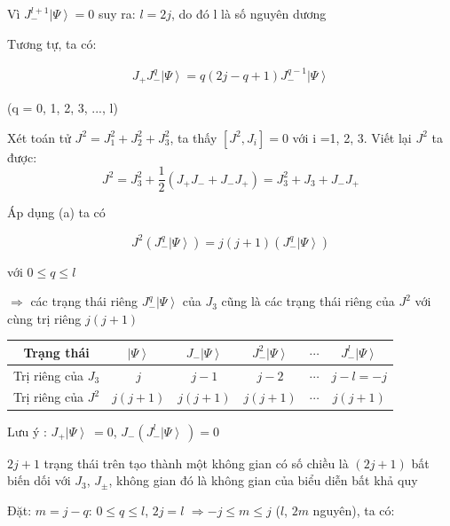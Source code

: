 \documentclass{report}
\begin{document}
Vì \( J_{-}^{l+1} \left| {\Psi} \right\rangle = 0 \) suy ra: \underline{\( l = 2j \)}, do đó l là số nguyên dương

Tương tự, ta có:

	\begin{align}
		J_{+}J_{-}^{q}  \left| {\Psi} \right\rangle = q (2j - q + 1) J_{-}^{q-1} \left| {\Psi} \right\rangle \tag{a}
	\end{align}

(q = 0, 1, 2, 3, ..., l)

Xét toán tử \( J^{2} = J_{1}^{2} + J_{2}^{2} + J_{3}^{2} \), ta thấy \( \left[ J^{2}, J_{i} \right] = 0 \) với i =1, 2, 3. Viết lại \( J^{2} \) ta được:
 \[ J^{2} = J^{2}_{3} + \frac{1}{2} \left( J_{+} J_{-} + J_{-}J _{+} \right) = J_{3}^{2} + J_{3} + J_{-} J_{+} \]

Áp dụng (a) ta có

\[ J^{2} \left( J_{-}^{q}  \left| {\Psi} \right\rangle \right) = j(j+1) \left( J_{-}^{q}  \left| {\Psi} \right\rangle \right) \]

với \( 0 \leq q \leq l \)

\(\Rightarrow\) các trạng thái riêng \(  J_{-}^{q}  \left| {\Psi} \right\rangle \) của \( J_{3} \) cũng là các trạng thái riêng của \( J^{2} \) với cùng trị riêng \( j(j+1) \)

	\begin{center}
		\begin{tabular}{ |c|c|c|c|c|c| } 
 			\hline
 			Trạng thái & \(\left| {\Psi} \right\rangle\) & \(J_{-} \left| {\Psi} \right\rangle\) & \(J_{-}^{2} \left| {\Psi} \right\rangle\) & \( \cdots \) & \(J_{-}^{l} \left| {\Psi} \right\rangle\) \\ 
 			\hline
			Trị riêng của \(J_{3}\) & \(j\) & \(j-1\) & \(j-2\) & \(\cdots\) & \(j - l = -j\) \\
 			\hline 
 Trị riêng của \(J^{2}\) & \(j(j+1)\) & \(j(j+1)\) & \(j(j+1)\) & \(\cdots\) & \(j(j+1)\) \\ 
 			\hline
		\end{tabular}
	\end{center}

Lưu ý : \( J_{+}  \left| {\Psi} \right\rangle\ = 0 \), \( J_{-} \left( J_{-}^{l}  \left| {\Psi} \right\rangle\ \right) = 0 \) 

\( 2j+1 \) trạng thái trên tạo thành một không gian có số chiều là \((2j+1)\) bất biến dối với \(J_{3}\), \(J_{\pm}\), không gian đó là không gian của biểu diễn bất khả quy

Đặt: \( m = j - q\): \( 0 \leq q \leq l \), \(2j=l\) \(\Rightarrow -j \leq m \leq j \) (\(l\), \(2m\) nguyên), ta có:
\end{document}
